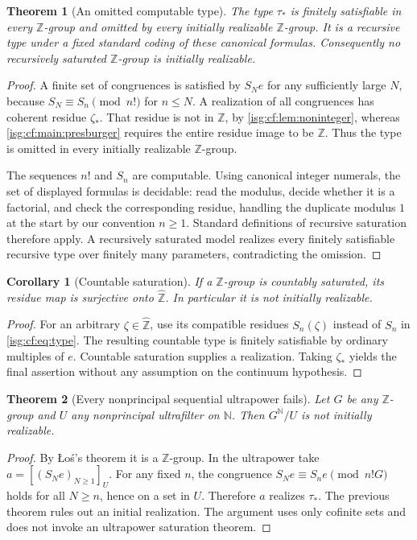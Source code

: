 \documentclass[11pt]{article}
\newtheorem{theorem}{Theorem}[section]
\newtheorem{corollary}[corollary]{Corollary}
\theoremstyle{definition}
\theoremstyle{remark}
\newcommand{\Z}{\mathbb{Z}}
\newcommand{\N}{\mathbb{N}}
\newcommand{\Zhat}{\widehat{\Z}}
\begin{document}
\begin{theorem}[An omitted computable type]\label{isg:cf:thm:type}
The type $\tau_*$ is finitely satisfiable in every $\Z$-group and omitted
by every initially realizable $\Z$-group. It is a recursive type under
a fixed standard coding of these canonical formulas. Consequently no
recursively saturated $\Z$-group is initially realizable.
\end{theorem}
\begin{proof}
A finite set of congruences is satisfied by $S_Ne$ for any sufficiently
large $N$, because $S_N\equiv S_n\pmod{n!}$ for $n\le N$.
A realization of all congruences has coherent residue $\zeta_*$.
That residue is not in $\Z$, by \cref{isg:cf:lem:noninteger}, whereas
\cref{isg:cf:main:presburger} requires the entire residue image to be
$\Z$. Thus the type is omitted in every initially realizable $\Z$-group.

The sequences $n!$ and $S_n$ are computable. Using canonical integer
numerals, the set of displayed formulas is decidable: read the modulus,
decide whether it is a factorial, and check the corresponding residue,
handling the duplicate modulus $1$ at the start by our convention
$n\ge1$. Standard definitions of recursive saturation therefore apply.
A recursively saturated model realizes every finitely satisfiable
recursive type over finitely many parameters, contradicting the omission.
\end{proof}

\begin{corollary}[Countable saturation]\label{isg:cf:cor:saturation}
If a $\Z$-group is countably saturated, its residue map is surjective
onto $\Zhat$. In particular it is not initially realizable.
\end{corollary}
\begin{proof}
For an arbitrary $\zeta\in\Zhat$, use its compatible residues
$S_n(\zeta)$ instead of $S_n$ in \eqref{isg:cf:eq:type}. The resulting
countable type is finitely satisfiable by ordinary multiples of $e$.
Countable saturation supplies a realization. Taking $\zeta_*$ yields
the final assertion without any assumption on the continuum hypothesis.
\end{proof}

\begin{theorem}[Every nonprincipal sequential ultrapower fails]\label{isg:cf:thm:ultrapower}
Let $G$ be any $\Z$-group and $U$ any nonprincipal ultrafilter on $\N$.
Then $G^\N/U$ is not initially realizable.
\end{theorem}
\begin{proof}
By \L o\'s's theorem it is a $\Z$-group. In the ultrapower take
$a=[(S_Ne)_{N\ge1}]_U$. For any fixed $n$, the congruence
$S_Ne\equiv S_ne\pmod{n!G}$ holds for all $N\ge n$, hence on a set
in $U$. Therefore $a$ realizes $\tau_*$. The previous theorem rules out
an initial realization. The argument uses only cofinite sets and does
not invoke an ultrapower saturation theorem.
\end{proof}
\end{document}
